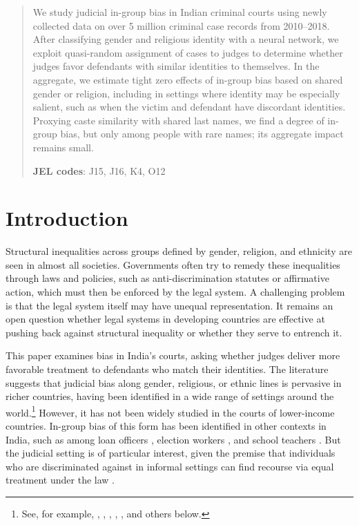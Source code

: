 \documentclass[12pt,english]{article}
\begin{document}
\vspace{-.75cm}

\begin{abstract}
    \singlespacing \noindent
    We study judicial in-group bias in Indian criminal courts using newly collected data on over 5 million criminal case records from 2010--2018. After classifying gender and religious identity with a neural network, we exploit quasi-random assignment of cases to judges to determine whether judges favor defendants with similar identities to themselves. In the aggregate, we estimate tight zero effects of in-group bias based on shared gender or religion, including in settings where identity may be especially salient, such as when the victim and defendant have discordant identities. Proxying caste similarity with shared last names, we find a degree of in-group bias, but only among people with rare names; its aggregate impact remains small.

    \noindent \textbf{JEL codes}: J15, J16, K4, O12
\end{abstract}

\section{Introduction}

Structural inequalities across groups defined by gender, religion, and ethnicity are seen in almost all societies. Governments often try to remedy these inequalities through laws and policies, such as anti-discrimination statutes or affirmative action, which must then be enforced by the legal system. A challenging problem is that the legal system itself may have unequal representation. It remains an open question whether legal systems in developing countries are effective at pushing back against structural inequality or whether they serve to entrench it.

This paper examines bias in India's courts, asking whether judges deliver more favorable treatment to defendants who match their identities. The literature suggests that judicial bias along gender, religious, or ethnic lines is pervasive in richer countries, having been identified in a wide range of settings around the world.\footnote{See, for example, \citet{ShayoZussman2011QJE}, \citet{Didwania2018CLE}, \citet{arnold2018racial}, \citet{AbramsBertrandMullainathan2012TJoLS}, \citet{AlesinaLaFerrara2014TAER}, \citet{anwar2019jury} and others below.} However, it has not been widely studied in the courts of lower-income countries. In-group bias of this form has been identified in other contexts in India, such as among loan officers \citep{fisman2020experience}, election workers \citep{neggers2018}, and school teachers \citep{HannaLinden2012AEJEP}. But the judicial setting is of particular interest, given the premise that individuals who are discriminated against in informal settings can find recourse via equal treatment under the law \citep{sandefur2013}.
\end{document}

